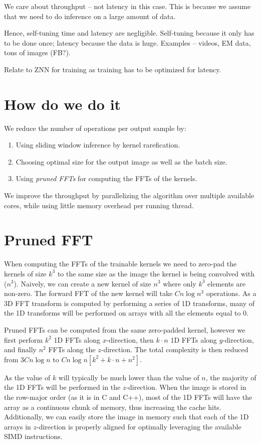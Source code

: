 \documentclass{article}
\begin{document}
We care about throughput -- not latency in this case.  This is because
we assume that we need to do inference on a large amount of data.

Hence, self-tuning time and latency are negligible.  Self-tuning
because it only has to be done once; latency because the data is huge.
Examples -- videos, EM data, tons of images (FB?).

Relate to ZNN for training as training has to be optimized for
latency.

\section{How do we do it}

We reduce the number of operations per output sample by:
\begin{enumerate}
\item Using sliding window inference by kernel rarefication.
\item Choosing optimal size for the output image as well as the batch
  size.
\item Using \emph{pruned FFTs} for computing the FFTs of the kernels.
\end{enumerate}

We improve the throughput by parallelizing the algorithm over multiple
available cores, while using little memory overhead per running
thread.


\section{Pruned FFT}

When computing the FFTs of the trainable kernels we need to zero-pad
the kernels of size $k^3$ to the same size as the image the kernel is
being convolved with ($n^3$).  Naively, we can create a new kernel of
size $n^3$ where only $k^3$ elements are non-zero.  The forward FFT of
the new kernel will take $C n\log n^3$ operations.  As a 3D FFT
transform is computed by performing a series of 1D transforms, many of
the 1D transforms will be performed on arrays with all the elements
equal to $0$.

Pruned FFTs can be computed from the same zero-padded kernel, however
we first perform $k^2$ 1D FFTs along $x$-direction, then $k \cdot n$
1D FFTs along $y$-direction, and finally $n^2$ FFTs along the
$z$-direction.  The total complexity is then reduced from $3C n\log n$
to $C n\log n[k^2 + k \cdot n + n^2]$.

As the value of $k$ will typically be much lower than the value of
$n$, the majority of the 1D FFTs will be performed in the
$z$-direction.  When the image is stored in the row-major order (as it
is in C and C++), most of the 1D FFTs will have the array as a
continuous chunk of memory, thus increasing the cache hits.
Additionally, we can easily store the image in memory such that each
of the 1D arrays in $z$-direction is properly aligned for optimally
leveraging the available SIMD instructions.
\end{document}
